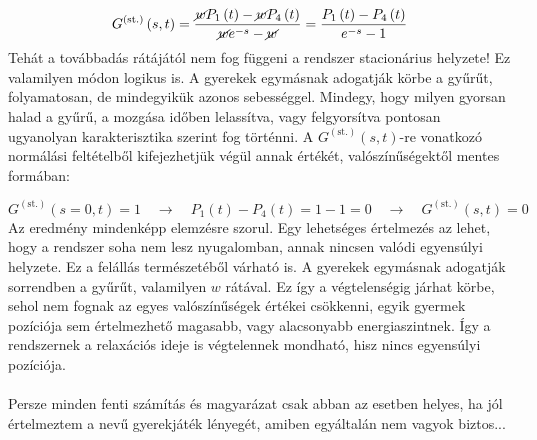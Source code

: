 \begin{equation} \label{eq:14}
    G^{\left( \text{st.} \right)} \left( s, t \right)
    =
    \frac{\cancel{w} P_{1} \left( t \right) - \cancel{w} P_{4} \left( t \right)}{\cancel{w} e^{-s} - \cancel{w}}
    =
    \frac{P_{1} \left( t \right) - P_{4} \left( t \right)}{e^{-s} - 1}
\end{equation}
Tehát a továbbadás rátájától nem fog függeni a rendszer stacionárius helyzete! Ez valamilyen módon logikus is. A gyerekek egymásnak adogatják körbe a gyűrűt, folyamatosan, de mindegyikük azonos sebességgel. Mindegy, hogy milyen gyorsan halad a gyűrű, a mozgása időben lelassítva, vagy felgyorsítva pontosan ugyanolyan karakterisztika szerint fog történni. A $G^{\left( \text{st.} \right)} \left( s, t \right)$-re vonatkozó normálási feltételből kifejezhetjük végül annak értékét, valószínűségektől mentes formában:

\begin{equation}
    G^{\left( \text{st.} \right)} \left( s=0, t \right)
    =
    1
    \quad \to \quad
    P_{1} \left( t \right) - P_{4} \left( t \right) = 1 - 1 = 0
    \quad \to \quad
    \boxed{
    G^{\left( \text{st.} \right)} \left( s, t \right)
    =
    0}
\end{equation}
Az eredmény mindenképp elemzésre szorul. Egy lehetséges értelmezés az lehet, hogy a rendszer soha nem lesz nyugalomban, annak nincsen valódi egyensúlyi helyzete. Ez a felállás természetéből várható is. A gyerekek egymásnak adogatják sorrendben a gyűrűt, valamilyen $w$ rátával. Ez így a végtelenségig járhat körbe, sehol nem fognak az egyes valószínűségek értékei csökkenni, egyik gyermek pozíciója sem értelmezhető magasabb, vagy alacsonyabb energiaszintnek. Így a rendszernek a relaxációs ideje is végtelennek mondható, hisz nincs egyensúlyi pozíciója.
\\ \\
Persze minden fenti számítás és magyarázat csak abban az esetben helyes, ha jól értelmeztem a  nevű gyerekjáték lényegét, amiben egyáltalán nem vagyok biztos...